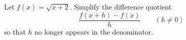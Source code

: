 Let $f(x)=\sqrt{x+2}$. Simplify the difference quotient
\[\dfrac{f(x+h)-f(x)}{h}\qquad(h\ne0)\]
so that $h$ no longer appears in the denominator.
